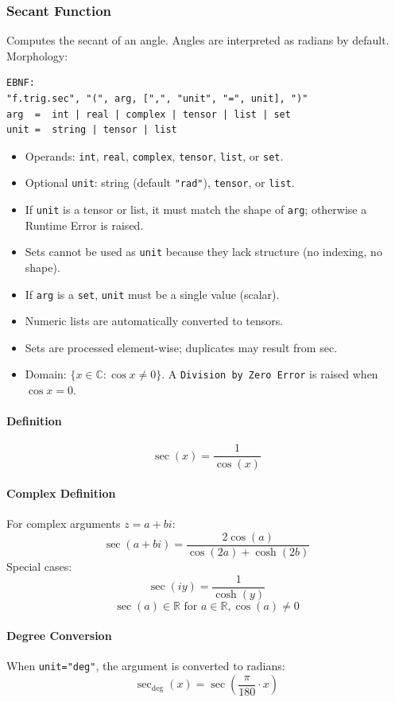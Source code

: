 \subsubsection{Secant Function}
Computes the secant of an angle. Angles are interpreted as radians by default.\\
Morphology:
\begin{verbatim}
EBNF:
"f.trig.sec", "(", arg, [",", "unit", "=", unit], ")"
arg  =  int | real | complex | tensor | list | set
unit =  string | tensor | list
\end{verbatim}
\begin{itemize}
\item Operands: \texttt{int}, \texttt{real}, \texttt{complex}, \texttt{tensor}, \texttt{list}, or \texttt{set}.
\item Optional \texttt{unit}: string (default \texttt{"rad"}), \texttt{tensor}, or \texttt{list}.
\item If \texttt{unit} is a tensor or list, it must match the shape of \texttt{arg}; otherwise a Runtime Error is raised.
\item Sets cannot be used as \texttt{unit} because they lack structure (no indexing, no shape).
\item If \texttt{arg} is a \texttt{set}, \texttt{unit} must be a single value (scalar).
\item Numeric lists are automatically converted to tensors.
\item Sets are processed element-wise; duplicates may result from sec.
\item Domain: $\{x \in \mathbb{C} : \cos x \neq 0\}$. A \texttt{Division by Zero Error} is raised when $\cos x = 0$.
\end{itemize}

\paragraph{Definition}
\[
\sec(x) = \frac{1}{\cos(x)}
\]

\paragraph{Complex Definition}
For complex arguments $z = a + bi$:
\[
\sec(a + bi) = \frac{2\cos(a)}{\cos(2a) + \cosh(2b)}
\]
Special cases:
\[
\sec(iy) = \frac{1}{\cosh(y)}
\]
\[
\sec(a) \in \mathbb{R} \text{ for } a \in \mathbb{R}, \cos(a) \neq 0
\]

\paragraph{Degree Conversion}
When \texttt{unit="deg"}, the argument is converted to radians:
\[
\sec_{\text{deg}}(x) = \sec\left(\frac{\pi}{180} \cdot x\right)
\]

